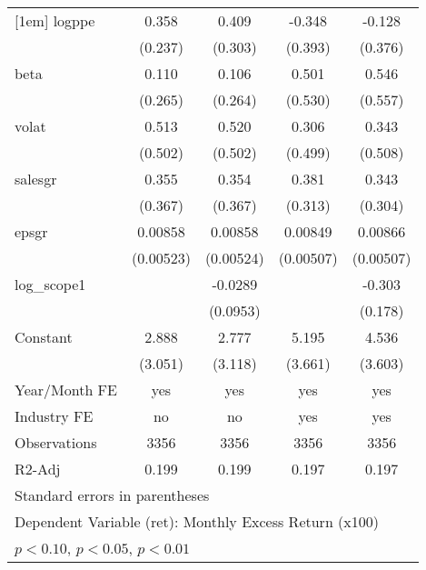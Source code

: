\begin{table}[htbp]
\begin{tabular}{l*{4}{c}}
[1em]
logppe              &       0.358         &       0.409         &      -0.348         &      -0.128         \\
                    &     (0.237)         &     (0.303)         &     (0.393)         &     (0.376)         \\
[1em]
beta                &       0.110         &       0.106         &       0.501         &       0.546         \\
                    &     (0.265)         &     (0.264)         &     (0.530)         &     (0.557)         \\
[1em]
volat               &       0.513         &       0.520         &       0.306         &       0.343         \\
                    &     (0.502)         &     (0.502)         &     (0.499)         &     (0.508)         \\
[1em]
salesgr             &       0.355         &       0.354         &       0.381         &       0.343         \\
                    &     (0.367)         &     (0.367)         &     (0.313)         &     (0.304)         \\
[1em]
epsgr               &     0.00858         &     0.00858         &     0.00849\sym{*}  &     0.00866\sym{*}  \\
                    &   (0.00523)         &   (0.00524)         &   (0.00507)         &   (0.00507)         \\
[1em]
log\_scope1          &                     &     -0.0289         &                     &      -0.303\sym{*}  \\
                    &                     &    (0.0953)         &                     &     (0.178)         \\
[1em]
Constant            &       2.888         &       2.777         &       5.195         &       4.536         \\
                    &     (3.051)         &     (3.118)         &     (3.661)         &     (3.603)         \\
\hline
Year/Month FE       &         yes         &         yes         &         yes         &         yes         \\
Industry FE         &          no         &          no         &         yes         &         yes         \\
Observations        &        3356         &        3356         &        3356         &        3356         \\
R2-Adj              &       0.199         &       0.199         &       0.197         &       0.197         \\
\hline\hline
\multicolumn{5}{l}{\footnotesize Standard errors in parentheses}\\
\multicolumn{5}{l}{\footnotesize Dependent Variable (ret): Monthly Excess Return (x100)}\\
\multicolumn{5}{l}{\footnotesize \sym{*} \(p<0.10\), \sym{**} \(p<0.05\), \sym{***} \(p<0.01\)}\\
\end{tabular}
\end{table}
